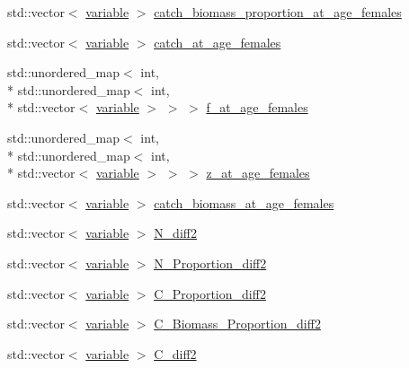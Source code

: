 \begin{DoxyCompactItemize}
std\-::vector$<$ \hyperlink{structmas_1_1_fleet_a1902d0842cb7ce9b9bdd4be013e709a9}{variable} $>$ \hyperlink{structmas_1_1_fleet_a461ed479ae0c386f261777e33a111e93}{catch\-\_\-biomass\-\_\-proportion\-\_\-at\-\_\-age\-\_\-females}
\item 
std\-::vector$<$ \hyperlink{structmas_1_1_fleet_a1902d0842cb7ce9b9bdd4be013e709a9}{variable} $>$ \hyperlink{structmas_1_1_fleet_a35939904cb0bd61c26516b2bf5753b2a}{catch\-\_\-at\-\_\-age\-\_\-females}
\item 
std\-::unordered\-\_\-map$<$ int, \\*
std\-::unordered\-\_\-map$<$ int, \\*
std\-::vector$<$ \hyperlink{structmas_1_1_fleet_a1902d0842cb7ce9b9bdd4be013e709a9}{variable} $>$ $>$ $>$ \hyperlink{structmas_1_1_fleet_abbb7e39885ce82578a901e585d3c1526}{f\-\_\-at\-\_\-age\-\_\-females}
\item 
std\-::unordered\-\_\-map$<$ int, \\*
std\-::unordered\-\_\-map$<$ int, \\*
std\-::vector$<$ \hyperlink{structmas_1_1_fleet_a1902d0842cb7ce9b9bdd4be013e709a9}{variable} $>$ $>$ $>$ \hyperlink{structmas_1_1_fleet_afb9df73617514f0606882e3ae2abb63c}{z\-\_\-at\-\_\-age\-\_\-females}
\item 
std\-::vector$<$ \hyperlink{structmas_1_1_fleet_a1902d0842cb7ce9b9bdd4be013e709a9}{variable} $>$ \hyperlink{structmas_1_1_fleet_ae892beaea7811cf46a6b5e8f2e2a3912}{catch\-\_\-biomass\-\_\-at\-\_\-age\-\_\-females}
\item 
std\-::vector$<$ \hyperlink{structmas_1_1_fleet_a1902d0842cb7ce9b9bdd4be013e709a9}{variable} $>$ \hyperlink{structmas_1_1_fleet_a43e9e4e070b2a3d7ab2c9a0ab59b1d15}{N\-\_\-diff2}
\item 
std\-::vector$<$ \hyperlink{structmas_1_1_fleet_a1902d0842cb7ce9b9bdd4be013e709a9}{variable} $>$ \hyperlink{structmas_1_1_fleet_a1f236a57978e3fbd4b59aeae849b00b5}{N\-\_\-\-Proportion\-\_\-diff2}
\item 
std\-::vector$<$ \hyperlink{structmas_1_1_fleet_a1902d0842cb7ce9b9bdd4be013e709a9}{variable} $>$ \hyperlink{structmas_1_1_fleet_a6ec61ed407b54fc36001cd7052f2493a}{C\-\_\-\-Proportion\-\_\-diff2}
\item 
std\-::vector$<$ \hyperlink{structmas_1_1_fleet_a1902d0842cb7ce9b9bdd4be013e709a9}{variable} $>$ \hyperlink{structmas_1_1_fleet_ac54bf241532c1f1a5859317484f54699}{C\-\_\-\-Biomass\-\_\-\-Proportion\-\_\-diff2}
\item 
std\-::vector$<$ \hyperlink{structmas_1_1_fleet_a1902d0842cb7ce9b9bdd4be013e709a9}{variable} $>$ \hyperlink{structmas_1_1_fleet_adaf77725042f3af5dbdb9a73aa506f4b}{C\-\_\-diff2}

\end{DoxyCompactItemize}
